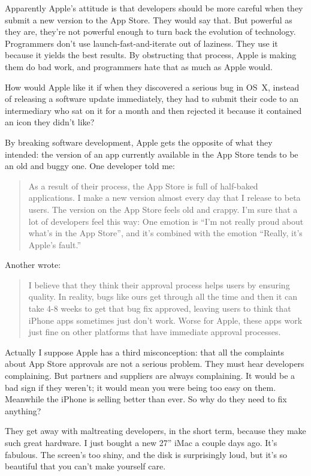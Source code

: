 Apparently Apple's attitude is that developers should be more careful
when they submit a new version to the App Store. They would say that.
But powerful as they are, they're not powerful enough to turn back the
evolution of technology. Programmers don't use launch-fast-and-iterate
out of laziness. They use it because it yields the best results. By
obstructing that process, Apple is making them do bad work, and
programmers hate that as much as Apple would.

How would Apple like it if when they discovered a serious bug in OS~X,
instead of releasing a software update immediately, they had to submit
their code to an intermediary who sat on it for a month and then
rejected it because it contained an icon they didn't like?

By breaking software development, Apple gets the opposite of what they
intended: the version of an app currently available in the App Store
tends to be an old and buggy one. One developer told me:

\begin{quote}
As a result of their process, the App Store is full of half-baked
applications. I make a new version almost every day that I release to
beta users. The version on the App Store feels old and crappy. I'm sure
that a lot of developers feel this way: One emotion is ``I'm not really
proud about what's in the App Store'', and it's combined with the
emotion ``Really, it's Apple's fault.''
\end{quote}

Another wrote:

\begin{quote}
I believe that they think their approval process helps users by ensuring
quality. In reality, bugs like ours get through all the time and then it
can take 4-8 weeks to get that bug fix approved, leaving users to think
that iPhone apps sometimes just don't work. Worse for Apple, these apps
work just fine on other platforms that have immediate approval
processes.
\end{quote}

Actually I suppose Apple has a third misconception: that all the
complaints about App Store approvals are not a serious problem. They
must hear developers complaining. But partners and suppliers are always
complaining. It would be a bad sign if they weren't; it would mean you
were being too easy on them. Meanwhile the iPhone is selling better than
ever. So why do they need to fix anything?

They get away with maltreating developers, in the short term, because
they make such great hardware. I just bought a new 27'' iMac a couple
days ago. It's fabulous. The screen's too shiny, and the disk is
surprisingly loud, but it's so beautiful that you can't make yourself
care.

